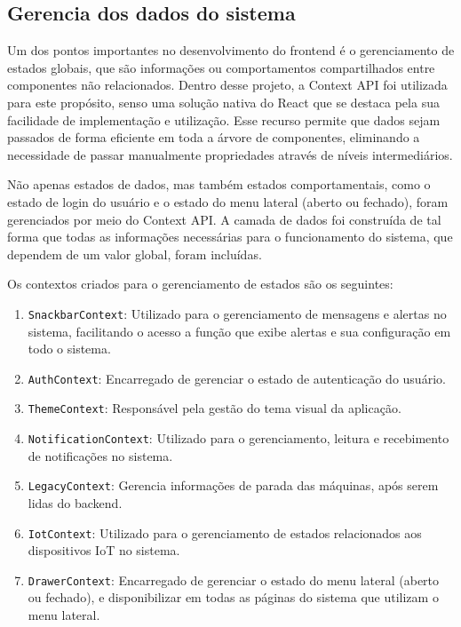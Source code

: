 \subsection{Gerencia dos dados do sistema}\label{subsec:contextApi}

Um dos pontos importantes no desenvolvimento do frontend é o gerenciamento de estados globais, que são informações ou comportamentos compartilhados entre componentes não relacionados. Dentro desse projeto, a Context \gls{API} foi utilizada para este propósito, senso uma solução nativa do React que se destaca pela sua facilidade de implementação e utilização. Esse recurso permite que dados sejam passados de forma eficiente em toda a árvore de componentes, eliminando a necessidade de passar manualmente propriedades através de níveis intermediários.

Não apenas estados de dados, mas também estados comportamentais, como o estado de login do usuário e o estado do menu lateral (aberto ou fechado), foram gerenciados por meio do Context \gls{API}. A camada de dados foi construída de tal forma que todas as informações necessárias para o funcionamento do sistema, que dependem de um valor global, foram incluídas.

Os contextos criados para o gerenciamento de estados são os seguintes:
\begin{enumerate}
    \item \texttt{SnackbarContext}: Utilizado para o gerenciamento de mensagens e alertas no sistema, facilitando o acesso a função que exibe alertas e sua configuração em todo o sistema.
    \item \texttt{AuthContext}: Encarregado de gerenciar o estado de autenticação do usuário. %
    \item \texttt{ThemeContext}: Responsável pela gestão do tema visual da aplicação. %
    \item \texttt{NotificationContext}: Utilizado para o gerenciamento, leitura e recebimento de notificações no sistema.
    \item \texttt{LegacyContext}: Gerencia informações de parada das máquinas, após serem lidas do backend.%
    \item \texttt{IotContext}: Utilizado para o gerenciamento de estados relacionados aos dispositivos IoT no sistema.
    \item \texttt{DrawerContext}: Encarregado de gerenciar o estado do menu lateral (aberto ou fechado), e disponibilizar em todas as páginas do sistema que utilizam o menu lateral.
\end{enumerate}

